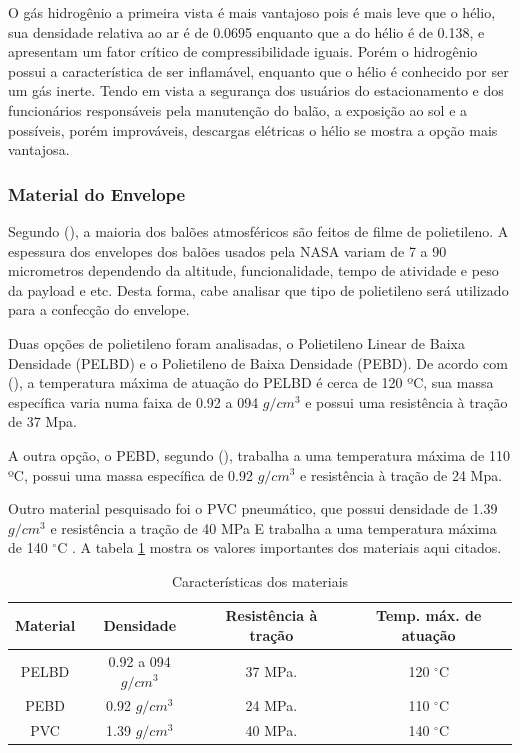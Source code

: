 	O gás hidrogênio a primeira vista é mais vantajoso pois é mais leve que o hélio, sua densidade relativa ao ar é de 0.0695 enquanto que a do hélio é de 0.138, e apresentam um fator crítico de compressibilidade iguais. Porém o hidrogênio possui a característica de ser inflamável, enquanto que o hélio é conhecido por ser um gás inerte. Tendo em vista a segurança dos usuários do estacionamento e dos funcionários responsáveis pela manutenção do balão, a exposição ao sol e a possíveis, porém improváveis,  descargas elétricas o hélio se mostra a opção mais vantajosa.

	\subsubsection{Material do Envelope}

	Segundo  (\citeyear{yajima}), a maioria dos balões atmosféricos são feitos de filme de polietileno. A espessura dos envelopes dos balões usados pela NASA variam de 7 a 90 micrometros dependendo da altitude, funcionalidade, tempo de atividade e peso da payload e etc. Desta forma, cabe analisar que tipo de polietileno será utilizado para a confecção do envelope.

	Duas opções de polietileno foram analisadas, o Polietileno Linear de Baixa Densidade (PELBD) e o Polietileno de Baixa Densidade (PEBD). De acordo com  (\citeyear{coutinho}), a temperatura máxima de atuação do PELBD é cerca de 120 ºC, sua massa específica varia numa faixa de 0.92 a 094 $g/cm^3$ e possui uma resistência à tração de 37 Mpa.

	A outra opção, o PEBD, segundo  (\citeyear{coutinho}), trabalha a uma temperatura máxima de 110 ºC, possui uma massa específica de 0.92 $g/cm^3$ e resistência à tração de 24 Mpa.

	Outro material pesquisado foi o PVC pneumático, que possui densidade de 1.39 $g/cm^3$ \cite{innovainstrucao} e resistência a tração de 40 MPa E trabalha a uma temperatura máxima de 140 $^{\circ}$C \cite{datasheetPvc}. A tabela \ref{tab:tabmaterial} mostra os valores importantes dos materiais aqui citados.

	\begin{table}[htp]
		\centering
		\caption{Características dos materiais}
		\label{tab:tabmaterial}
		\begin{tabular}{ | c | c | c | c |}
			\hline
			\textbf{Material} &\textbf{Densidade} &\textbf{Resistência à tração} &\textbf{Temp. máx. de atuação}\\ \hline
			PELBD & 0.92 a 094 $g/cm^3$ &   37 MPa.&  120 $^{\circ}$C \\ \hline
			PEBD & 0.92 $g/cm^3$ &  24 MPa.&  110 $^{\circ}$C \\ \hline
			PVC & 1.39 $g/cm^3$ &  40 MPa.& 140 $^{\circ}$C \\
			\hline
		\end{tabular}
	\end{table}


